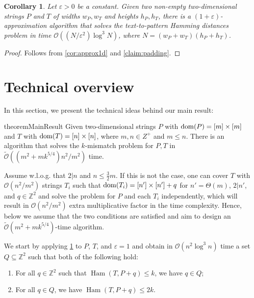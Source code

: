 \documentclass[11pt, letterpaper]{article}
\theoremstyle{plain}
\newtheorem{corollary}[fact]{Corollary}
\theoremstyle{definition}
\theoremstyle{remark}
\newcommand{\Z}{\mathbb{Z}}
\renewcommand{\O}{\mathcal{O}}
\newcommand{\tO}{\tilde{\mathcal{O}}}
\DeclareMathOperator*{\Ham}{Ham}
\begin{document}
\begin{corollary}\label{cor:approx2d}
Let $\varepsilon > 0$ be a constant. Given two non-empty two-dimensional strings $P$ and $T$ of widths $w_P, w_T$ and heights $h_P, h_T$, there is a $(1+\varepsilon)$-approximation algorithm that solves the text-to-pattern Hamming distances problem in time $\O((N/\varepsilon^2)  \log^3 N)$, where $N = (w_P + w_T)(h_P + h_T)$.
\end{corollary}
\begin{proof}
Follows from \cref{cor:approx1d} and \cref{claim:padding}. 
\end{proof}


\section{Technical overview}
In this section, we present the technical ideas behind our main result:

\begin{restatable}{theorem}{MainResult}\label{th:main}
Given two-dimensional strings $P$ with $\operatorname*{dom}(P) = [m] \times [m]$ and $T$ with $\operatorname*{dom}(T) = [n] \times [n]$, where $m,n\in Z^+$ and $m \le n$. There is an algorithm that solves the $k$-mismatch problem for $P,T$ in $\tO((m^2 + mk^{5/4})n^2 / m^2)$ time.
\end{restatable}

 Assume w.l.o.g. that $2|n$ and $n \le \frac{3}{2}m$. If this is not the case, one can cover $T$ with $\O(n^2/m^2)$ strings $T_i$ such that $\operatorname*{dom}(T_i) = [n'] \times [n'] + q$ for $n' = \Theta(m)$, $2|n'$, and $q \in \Z^2$ and solve the problem for $P$ and each $T_i$ independently, which will result in $\O(n^2/m^2)$ extra multiplicative factor in the time complexity. Hence, below we assume that the two conditions are satisfied and aim to design an $\tO(m^2 + mk^{5/4})$-time algorithm. 

We start by applying \cref{cor:approx2d} to $P$, $T$, and $\varepsilon = 1$ and obtain in $\O(n^2 \log^3 n)$ time a set $Q \subseteq \Z^2$ such that both of the following hold:
\begin{enumerate}
\item For all $q \in \Z^2$ such that $\Ham(T, P+q) \le k$, we have $q \in Q$;
\item For all $q \in Q$, we have $\Ham(T, P+q) \le 2 k$.
\end{enumerate}
\end{document}
